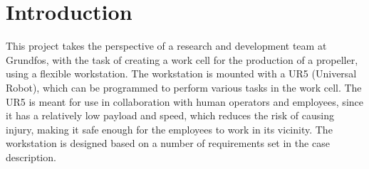 \chapter{Introduction} \label{ch:introduction}

This project takes the perspective of a research and development team at Grundfos, with the task of creating a work cell for the production of a propeller, using a flexible workstation. The workstation is mounted with a UR5 (Universal Robot), which can be programmed to perform various tasks in the work cell. The UR5 is meant for use in collaboration with human operators and employees, since it has a relatively low payload and speed, which reduces the risk of causing injury, making it safe enough for the employees to work in its vicinity. The workstation is designed based on a number of requirements set in the case description.\\


